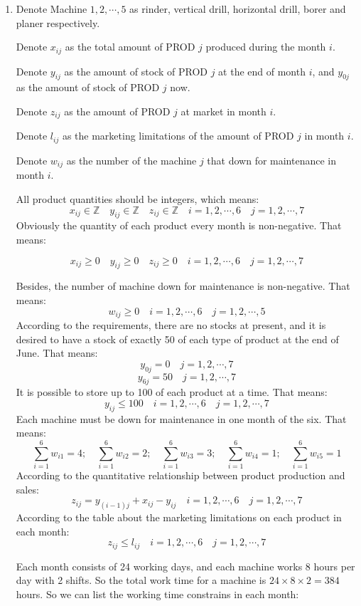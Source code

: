 \documentclass[12pt,a4paper]{article}
\makeatletter
\newtheorem*{solution}{Solution}
\theoremstyle{definition}
\renewenvironment{solution}[1][Solution] {\par\pushQED{\qed}\normalfont\topsep6\p@\@plus6\p@\relax\trivlist\item[\hskip\labelsep\bfseries#1\@addpunct{.}]\ignorespaces}{\popQED\endtrivlist\@endpefalse} \makeatother
\makeatother
\begin{document}
\begin{enumerate}
\begin{solution}
\begin{enumerate}
	Denote Machine $1,2,\cdots,5$ as rinder,  vertical drill, horizontal drill,  borer and planer respectively.

	Denote $x_{ij}$ as  the total amount of PROD $j$ produced during the month $i$.
	
	Denote $y_{ij}$ as the amount of stock of PROD $j$ at the end of month $i$, and $y_{0j}$ as the amount of stock of PROD $j$ now. 
	
	Denote $z_{ij}$ as the amount of PROD $j$ at market in month $i$.
	
	Denote $l_{ij}$ as the marketing limitations of the amount of PROD $j$ in month $i$.
	
	Denote $w_{ij}$ as the number of the machine $j$ that down for maintenance in month $i$.
	
	All product quantities should be integers, which means:
	$$x_{ij} \in \mathbb{Z}\quad y_{ij} \in \mathbb{Z}\quad z_{ij} \in \mathbb{Z} \quad i = 1,2,\cdots,6 \quad j=1,2,\cdots,7$$
	Obviously the quantity of each product every month is non-negative. That means:
	
	$$x_{ij} \geqslant 0 \quad y_{ij} \geqslant 0 \quad z_{ij} \geqslant 0 \quad i = 1,2,\cdots,6 \quad j=1,2,\cdots,7 $$
	
	Besides, the number of machine down for maintenance is non-negative. That means:
	$$w_{ij} \geqslant 0 \quad i = 1,2,\cdots,6 \quad j=1,2,\cdots,5 $$
	According to the requirements, there are no stocks at present, and it is desired to have a stock of exactly 50 of each type of product at the end of June. That means:
	$$y_{0j} = 0 \quad j=1,2,\cdots,7$$
	$$y_{6j} = 50 \quad j=1,2,\cdots,7$$
	It is possible to store up to 100 of each product at a time. That means:
	$$y_{ij} \leqslant 100 \quad i = 1,2,\cdots,6 \quad j=1,2,\cdots,7$$
	Each machine must be down for maintenance in one month of the six. That means:
	$$\sum^{6}_{i = 1}w_{i1} = 4;\quad\sum^{6}_{i = 1}w_{i2} = 2;\quad\sum^{6}_{i = 1}w_{i3} = 3;\quad\sum^{6}_{i = 1}w_{i4} = 1;\quad\sum^{6}_{i = 1}w_{i5} = 1$$
	According to the quantitative relationship between product production and sales:
	$$z_{ij} = y_{(i-1)j} + x_{ij} - y_{ij} \quad i = 1,2,\cdots,6 \quad j=1,2,\cdots,7 $$
	According to the table about the marketing limitations on each product in each month:
	$$z_{ij} \leqslant l_{ij} \quad i=1,2,\cdots,6 \quad j=1,2,\cdots,7$$
	
	Each month consists of 24 working days, and each machine works 8 hours per day with 2 shifts. So the total work time for a machine is $24\times8\times2=384$ hours. So we can list the working time constrains in each month:
	

\end{enumerate}
\end{solution}
\end{enumerate}
\end{document}
